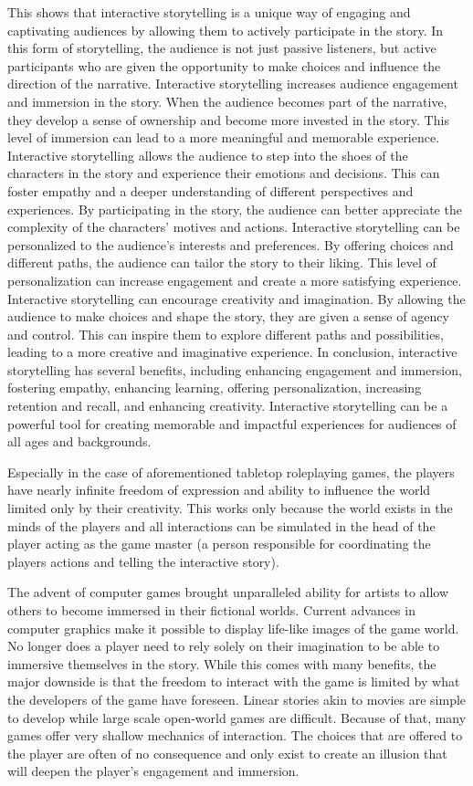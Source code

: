 %
This shows that interactive storytelling is a unique way of engaging and captivating audiences by allowing them to actively participate in the story.
In this form of storytelling, the audience is not just passive listeners, but active participants who are given the opportunity to make choices and influence the direction of the narrative.
Interactive storytelling increases audience engagement and immersion in the story. When the audience becomes part of the narrative, they develop a sense of ownership and become more invested in the story.
This level of immersion can lead to a more meaningful and memorable experience.
Interactive storytelling allows the audience to step into the shoes of the characters in the story and experience their emotions and decisions.
This can foster empathy and a deeper understanding of different perspectives and experiences.
By participating in the story, the audience can better appreciate the complexity of the characters' motives and actions.
Interactive storytelling can be personalized to the audience's interests and preferences.
By offering choices and different paths, the audience can tailor the story to their liking.
This level of personalization can increase engagement and create a more satisfying experience.
Interactive storytelling can encourage creativity and imagination.
By allowing the audience to make choices and shape the story, they are given a sense of agency and control.
This can inspire them to explore different paths and possibilities, leading to a more creative and imaginative experience.
In conclusion, interactive storytelling has several benefits, including enhancing engagement and immersion, fostering empathy, enhancing learning, offering personalization, increasing retention and recall, and enhancing creativity.
Interactive storytelling can be a powerful tool for creating memorable and impactful experiences for audiences of all ages and backgrounds.
%

Especially in the case of aforementioned tabletop roleplaying games, the players have nearly infinite freedom of expression and ability to influence the world limited only by their creativity.
This works only because the world exists in the minds of the players and all interactions can be simulated in the head of the player acting as the game master (a person responsible for coordinating the players actions and telling the interactive story).

The advent of computer games brought unparalleled ability for artists to allow others to become immersed in their fictional worlds.
Current advances in computer graphics make it possible to display life-like images of the game world.
No longer does a player need to rely solely on their imagination to be able to immersive themselves in the story.
While this comes with many benefits, the major downside is that the freedom to interact with the game is limited by what the developers of the game have foreseen.
Linear stories akin to movies are simple to develop while large scale open-world games are difficult.
Because of that, many games offer very shallow mechanics of interaction.
The choices that are offered to the player are often of no consequence and only exist to create an illusion that will deepen the player's engagement and immersion.

